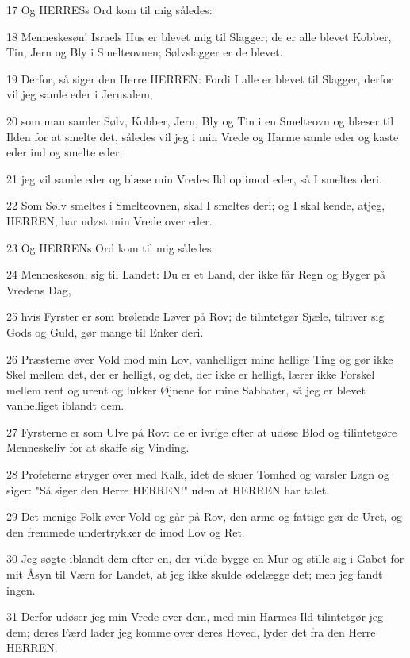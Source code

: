\par 17 Og HERRESs Ord kom til mig således:
\par 18 Menneskesøn! Israels Hus er blevet mig til Slagger; de er alle blevet Kobber, Tin, Jern og Bly i Smelteovnen; Sølvslagger er de blevet.
\par 19 Derfor, så siger den Herre HERREN: Fordi I alle er blevet til Slagger, derfor vil jeg samle eder i Jerusalem;
\par 20 som man samler Sølv, Kobber, Jern, Bly og Tin i en Smelteovn og blæser til Ilden for at smelte det, således vil jeg i min Vrede og Harme samle eder og kaste eder ind og smelte eder;
\par 21 jeg vil samle eder og blæse min Vredes Ild op imod eder, så I smeltes deri.
\par 22 Som Sølv smeltes i Smelteovnen, skal I smeltes deri; og I skal kende, atjeg, HERREN, har udøst min Vrede over eder.
\par 23 Og HERRENs Ord kom til mig således:
\par 24 Menneskesøn, sig til Landet: Du er et Land, der ikke får Regn og Byger på Vredens Dag,
\par 25 hvis Fyrster er som brølende Løver på Rov; de tilintetgør Sjæle, tilriver sig Gods og Guld, gør mange til Enker deri.
\par 26 Præsterne øver Vold mod min Lov, vanhelliger mine hellige Ting og gør ikke Skel mellem det, der er helligt, og det, der ikke er helligt, lærer ikke Forskel mellem rent og urent og lukker Øjnene for mine Sabbater, så jeg er blevet vanhelliget iblandt dem.
\par 27 Fyrsterne er som Ulve på Rov: de er ivrige efter at udøse Blod og tilintetgøre Menneskeliv for at skaffe sig Vinding.
\par 28 Profeterne stryger over med Kalk, idet de skuer Tomhed og varsler Løgn og siger: "Så siger den Herre HERREN!" uden at HERREN har talet.
\par 29 Det menige Folk øver Vold og går på Rov, den arme og fattige gør de Uret, og den fremmede undertrykker de imod Lov og Ret.
\par 30 Jeg søgte iblandt dem efter en, der vilde bygge en Mur og stille sig i Gabet for mit Åsyn til Værn for Landet, at jeg ikke skulde ødelægge det; men jeg fandt ingen.
\par 31 Derfor udøser jeg min Vrede over dem, med min Harmes Ild tilintetgør jeg dem; deres Færd lader jeg komme over deres Hoved, lyder det fra den Herre HERREN.


